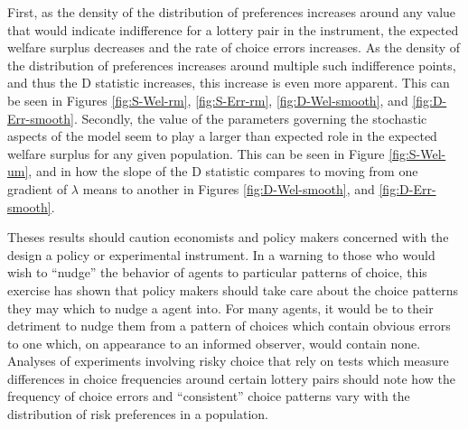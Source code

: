 \documentclass[../main.tex]{subfiles}
\begin{document}
First, as the density of the distribution of preferences increases around any value that would indicate indifference for a lottery pair in the instrument, the expected welfare surplus decreases and the rate of choice errors increases.
As the density of the distribution of preferences increases around multiple such indifference points, and thus the D statistic increases, this increase is even more apparent.
This can be seen in Figures \ref{fig:S-Wel-rm}, \ref{fig:S-Err-rm}, \ref{fig:D-Wel-smooth}, and \ref{fig:D-Err-smooth}.
Secondly, the value of the parameters governing the stochastic aspects of the model seem to play a larger than expected role in the expected welfare surplus for any given population.
This can be seen in Figure \ref{fig:S-Wel-um}, and in how the slope of the D statistic compares to moving from one gradient of $\lambda$ means to another in Figures \ref{fig:D-Wel-smooth}, and \ref{fig:D-Err-smooth}.

Theses results should caution economists and policy makers concerned with the design a policy or experimental instrument.
In a warning to those who would wish to \enquote{nudge} the behavior of agents to particular patterns of choice, this exercise has shown that policy makers should take care about the choice patterns they may which to nudge a agent into.
For many agents, it would be to their detriment to nudge them from a pattern of choices which contain obvious errors to one which, on appearance to an informed observer, would contain none.
Analyses of experiments involving risky choice that rely on tests which measure differences in choice frequencies around certain lottery pairs should note how the frequency of choice errors and \enquote{consistent} choice patterns vary with the distribution of risk preferences in a population.


\newpage

\onlyinsubfile{
\newpage
\printbibliography[segment=3, heading=subbibliography]
}
\end{document}
